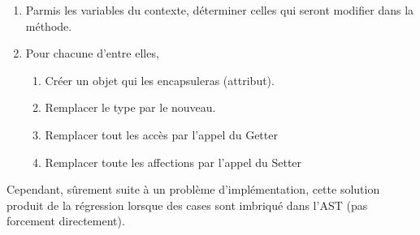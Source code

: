\documentclass[a4paper]{article}
\begin{document}
\begin{enumerate}
	\item Parmis les variables du contexte, déterminer celles qui seront modifier dans la méthode.
	\item Pour chacune d'entre elles, 
	\begin{enumerate}
	\item Créer un objet qui les encapsuleras (attribut).
	\item Remplacer le type par le nouveau.
	\item Remplacer tout les accès par l'appel du Getter
	\item Remplacer toute les affections par l'appel du Setter
	\end{enumerate}
	
\end{enumerate}	

\par
Cependant, sûrement suite à un problème d'implémentation, cette solution produit de la régression lorsque des cases sont imbriqué dans l'AST (pas forcement directement).
\end{document}
